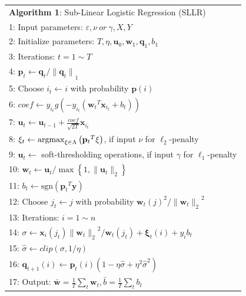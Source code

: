 \documentclass[10pt, conference, compsocconf]{IEEEtran}
\newcommand{\bw}{\mathbf{w}}
\newcommand{\bu}{\mathbf{u}}
\newcommand{\bp}{\mathbf{p}}
\newcommand{\bq}{\mathbf{q}}
\newcommand{\bxi}{\mathbf{\xi}}
\newcommand{\lc}{\left(}
\newcommand{\rc}{\right)}
\newcommand{\li}{\lc i\rc}
\newcommand{\lj}{\lc j\rc}
\newcommand{\tspace}{\hspace*{2em}}
\newcommand{\tspaces}{\hspace*{1.5em}}
\def\argmax{\mathop{\rm argmax}}
\def\sgn{\mathrm{sgn}}
\begin{document}
	\begin{table} [ht]
	\begin{tabular}{l}
	\hline\noalign{\smallskip}
	\textbf{Algorithm 1}: Sub-Linear Logistic Regression (SLLR) \\
	\noalign{\smallskip}
	\hline
	\noalign{\smallskip}
	1:	Input parameters: $\varepsilon, \nu~or~\gamma, X, Y$ \\
	2:	Initialize parameters: $T, \eta, {\mathbf{u}}_{0}, {\bw}_{1}, {\mathbf{\bq}}_{1}, {b}_{1}$\\
	3:	Iterations: $t=1 \sim T$ \\
	4:	\tspace ${\bp}_{t}\leftarrow{\bq}_{t}/{\|{\bq}_{t}\|}_{1}$ \\
	5:  \tspace Choose ${i}_{t}\leftarrow i$ with probability $\bp(i)$ \\
	6:	\tspace $coef\leftarrow{y}_{{i}_{t}}g\lc-{y}_{{i}_{t}}\lc {{\bw}_{t}}^{T}{\mathbf{x}}_{i_t}+{b}_{t} \rc\rc$ \\
	7:	\tspace ${\bu}_{t}\leftarrow {\bu}_{t-1}+\frac{coef}{\sqrt{2T}}{\mathbf{x}}_{{i}_{t}}$ \\
    8:  \tspace ${\bxi}_{t}\leftarrow \argmax_{\bxi\in \Lambda}\lc{{\bp}_{t}}^{T}\bxi\rc$, if input $\nu$ for $\ell_2$-penalty \\
    9:  \tspace $\bu_t\leftarrow$ soft-thresholding operations, if input $\gamma$ for $\ell_1$-penalty \\
	10:	\tspaces ${\bw}_{t}\leftarrow {\bu}_{t}/\max \left\{1,\|{\bu}_{t}\|_2 \right\}$ \\
    11: \tspaces ${b}_{t}\leftarrow \sgn\lc {{\bp}_{t}}^{T}\mathbf{y}\rc$ \\
	12:	\tspaces Choose ${j}_{t}\leftarrow j$ with probability ${{\bw}_{t}\lj}^{2}/{\|{\bw}_{t}\|_2}^{2} $ \\
	13:	\tspaces Iterations: $i=1 \sim n$ \\
	14:	\tspaces\tspace $\sigma \leftarrow \mathbf{x}_{i} \lc {j}_{t}\rc{\|{\bw}_{t}\|_2}^{2}/{\bw}_{t}\lc {j}_{t} \rc+{\bxi}_{t}\li+{y}_{i}{b}_{t}$ \\
	15:	\tspaces\tspace $\hat{\sigma} \leftarrow clip\lc \sigma,1/\eta \rc$ \\
	16:	\tspaces\tspace ${\bq}_{t+1}\li \leftarrow {\bp}_{t}\li\lc 1-\eta\hat{\sigma} + {\eta}^{2}{\hat{\sigma}}^{2} \rc$ \\
	17:	Output: $\bar{\bw}=\frac{1}{T}\sum_{t}{\bw}_{t},\bar{b}=\frac{1}{T}\sum_{t}{b}_{t}$ \\
	\hline
	\end{tabular} 	
	\label{alg:1}
	\end{table}
\end{document}
